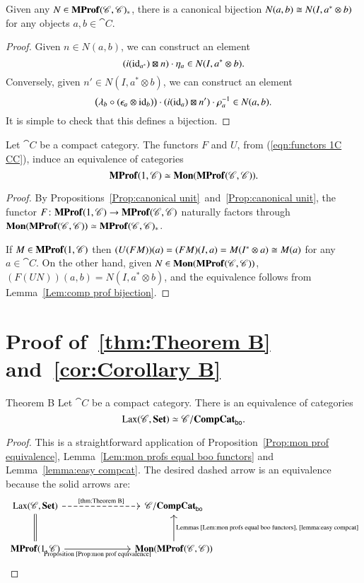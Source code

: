 \documentclass[12pt,oneside,article,draft]{memoir}
\begin{document}
\begin{lemma}\label{Lem:comp prof bijection}
	Given any $N\in\mathbf{MProf}(\mathscr{C},\mathscr{C})_*$, there is a canonical bijection $N(a,b)\cong N(I,a^*\otimes b)$ for any objects $a,b\in\cat{C}$.
\end{lemma}
\begin{proof}
	Given $n\in N(a,b)$, we can construct an element
	\[
		(i(\operatorname{id}_{a^*})\boxtimes n)\cdot\eta_a \in N(I,a^*\otimes b).
	\]
	Conversely, given $n'\in N(I,a^*\otimes b)$, we can construct an element 
	\[
		\bigl(\lambda_b\circ(\epsilon_a\otimes\operatorname{id}_b)\bigr)\cdot(i(\operatorname{id}_a)\boxtimes n')\cdot\rho_a^{-1} \in N(a,b).
	\]
	It is simple to check that this defines a bijection.
\end{proof}

\begin{proposition}\label{Prop:mon prof equivalence}
	Let $\cat{C}$ be a compact category.
	The functors $F$ and $U$, from (\ref{eqn:functors 1C CC}), induce an equivalence of categories 
	\[
		\mathbf{MProf}(1,\mathscr{C})\simeq\mathbf{Mon}(\mathbf{MProf}(\mathscr{C},\mathscr{C})).
	\]
\end{proposition}
\begin{proof}
	By Propositions~\ref{Prop:canonical unit}~and~\ref{Prop:canonical unit}, the functor $F\colon\mathbf{MProf}(1,\mathscr{C}) \to \mathbf{MProf}(\mathscr{C},\mathscr{C})$ naturally factors through $\mathbf{Mon}(\mathbf{MProf}(\mathscr{C},\mathscr{C}))\simeq\mathbf{MProf}(\mathscr{C},\mathscr{C})_*$. 

	If $M\in\mathbf{MProf}(1,\mathscr{C})$ then $(U(FM))(a)=(FM)(I,a)=M(I^*\otimes a)\cong M(a)$ for any $a\in\cat{C}$.
	On the other hand, given $N\in\mathbf{Mon}(\mathbf{MProf}(\mathscr{C},\mathscr{C}))$, $(F(UN))(a,b)=N(I,a^*\otimes b)$, and the equivalence follows from Lemma~\ref{Lem:comp prof bijection}.
\end{proof}

\section{Proof of~\ref{thm:Theorem B} and~\ref{cor:Corollary B}}\label{sec:proof of Bs}

\begin{named}{Theorem B}\label{thm:Theorem B}
	Let $\cat{C}$ be a compact category. There is an equivalence of categories
	\[
		\operatorname{Lax}(\mathscr{C},\mathbf{Set})\simeq\mathscr{C}/\mathbf{CompCat}_{\mathsf{bo}}.
	\]
\end{named}
\begin{proof}
	This is a straightforward application of Proposition~\ref{Prop:mon prof equivalence}, Lemma~\ref{Lem:mon profs equal boo functors} and Lemma~\ref{lemma:easy compcat}.
	The desired dashed arrow is an equivalence because the solid arrows are:
	$$
	\begin{tikzcd}[column sep=2.5cm,row sep=1cm]
		\Lax(\cat{C},\Set)\ar[d,equal]\ar[r,dashed,"\tn{\ref{thm:Theorem B}}"]
			&\cat{C}/\CompCat_{\bo} \\
		\MProf(1,\cat{C})\ar[r,"\tn{Proposition~\ref{Prop:mon prof equivalence}}"']
			&\Mon(\MProf(\cat{C},\cat{C}))\ar[u,"\tn{Lemmas~\ref{Lem:mon profs equal boo functors},~\ref{lemma:easy compcat}}"']
	\end{tikzcd}
	$$
\end{proof} 
\end{document}
